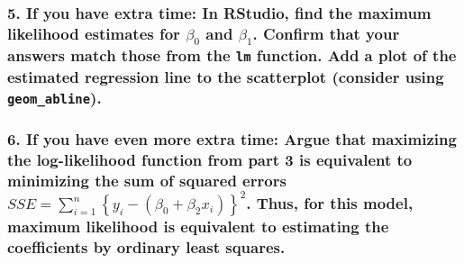 \documentclass[]{article}
\begin{document}
\subsubsection{\texorpdfstring{5. If you have extra time: In RStudio,
find the maximum likelihood estimates for \(\beta_0\) and \(\beta_1\).
Confirm that your answers match those from the \texttt{lm} function. Add
a plot of the estimated regression line to the scatterplot (consider
using
\texttt{geom\_abline}).}{5. If you have extra time: In RStudio, find the maximum likelihood estimates for \textbackslash{}beta\_0 and \textbackslash{}beta\_1. Confirm that your answers match those from the lm function. Add a plot of the estimated regression line to the scatterplot (consider using geom\_abline).}}\label{if-you-have-extra-time-in-rstudio-find-the-maximum-likelihood-estimates-for-beta_0-and-beta_1.-confirm-that-your-answers-match-those-from-the-lm-function.-add-a-plot-of-the-estimated-regression-line-to-the-scatterplot-consider-using-geom_abline.}

\subsubsection{\texorpdfstring{6. If you have even more extra time:
Argue that maximizing the log-likelihood function from part 3 is
equivalent to minimizing the sum of squared errors
\(SSE = \sum_{i = 1}^n \left\{y_i - (\beta_0 + \beta_2 x_{i}) \right\}^2\).
Thus, for this model, maximum likelihood is equivalent to estimating the
coefficients by ordinary least
squares.}{6. If you have even more extra time: Argue that maximizing the log-likelihood function from part 3 is equivalent to minimizing the sum of squared errors SSE = \textbackslash{}sum\_\{i = 1\}\^{}n \textbackslash{}left\textbackslash{}\{y\_i - (\textbackslash{}beta\_0 + \textbackslash{}beta\_2 x\_\{i\}) \textbackslash{}right\textbackslash{}\}\^{}2. Thus, for this model, maximum likelihood is equivalent to estimating the coefficients by ordinary least squares.}}\label{if-you-have-even-more-extra-time-argue-that-maximizing-the-log-likelihood-function-from-part-3-is-equivalent-to-minimizing-the-sum-of-squared-errors-sse-sum_i-1n-lefty_i---beta_0-beta_2-x_i-right2.-thus-for-this-model-maximum-likelihood-is-equivalent-to-estimating-the-coefficients-by-ordinary-least-squares.}
\end{document}
